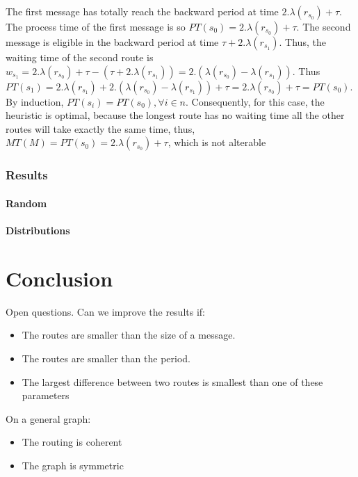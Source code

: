 \documentclass[a4paper,10pt]{article}
\begin{document}
The first message has totally reach the backward period at time $2.\lambda(r_{s_0})+\tau$. The process time of the first message is so $PT(s_0) = 2.\lambda(r_{s_0}) + \tau$.
The second message is eligible in the backward period at time $\tau + 2.\lambda(r_{s_1})$. Thus, the waiting time of the second route is $w_{s_1} = 2.\lambda(r_{s_0})+\tau - (\tau + 2.\lambda(r_{s_1})) = 2.(\lambda(r_{s_0}) - \lambda(r_{s_1}))$. Thus $PT(s_1) = 2.\lambda(r_{s_1}) + 2.(\lambda(r_{s_0}) - \lambda(r_{s_1})) +\tau = 2.\lambda(r_{s_0}) + \tau = PT(s_0)$.
By induction, $PT(s_i) = PT(s_0), \forall i \in n$. 
Consequently, for this case, the heuristic is optimal, because the longest route has no waiting time all the other routes will take exactly the same time, thus, $MT(M) = PT(s_0) = 2.\lambda(r_{s_0}) + \tau$, which is not alterable

     \subsubsection{Results}
	 \paragraph{Random}
	 \paragraph{Distributions}
   
\section{Conclusion}


Open questions. Can we improve the results if:
\begin{itemize}
 \item The routes are smaller than the size of a message. 
\item The routes are smaller than the period.
\item The largest difference between two routes is smallest than one of these parameters
\end{itemize}

 On a general graph:
 
\begin{itemize}
\item The routing is coherent
 \item The graph is symmetric
\end{itemize}
\end{document}
